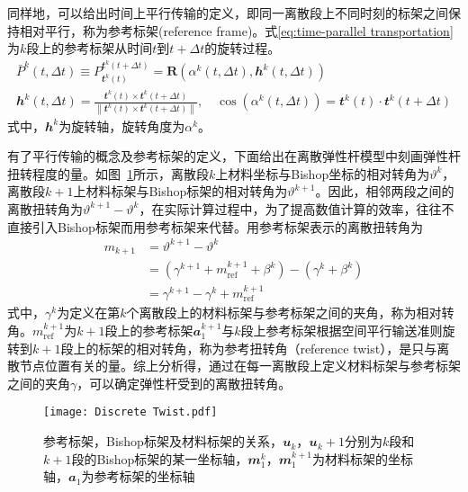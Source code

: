 同样地，可以给出时间上平行传输的定义，即同一离散段上不同时刻的标架之间保持相对平行，称为参考标架(reference frame)。式\eqref{eq:time-parallel transportation}为$k$段上的参考标架从时间$t$到$t+\Delta t$的旋转过程。
\begin{equation}
	\begin{gathered}
		\bar{P}^{k}(t, \Delta t) \equiv P_{\mathbfit{t}^{k}(t)}^{\mathbfit{t}^{k}(t+\Delta t)}=\mathbf{R}\left(\alpha^{k}(t, \Delta t), \mathbfit{h}^{k}(t, \Delta t)\right) \\
		\mathbfit{h}^{k}(t, \Delta t)=\frac{\mathbfit{t}^{k}(t) \times \mathbfit{t}^{k}(t+\Delta t)}{\left\|\mathbfit{t}^{k}(t) \times \mathbfit{t}^{k}(t+\Delta t)\right\|}, \quad \cos \left(\alpha^{k}(t, \Delta t)\right)=\mathbfit{t}^{k}(t) \cdot \mathbfit{t}^{k}(t+\Delta t)
\end{gathered}
\label{eq:time-parallel transportation}
\end{equation}
式中，$\mathbfit{h}^k$为旋转轴，旋转角度为$\alpha^k$。

有了平行传输的概念及参考标架的定义，下面给出在离散弹性杆模型中刻画弹性杆扭转程度的量。如图~\ref{fig:Discrete Twist}所示，离散段$k$上材料坐标与Bishop坐标的相对转角为$\vartheta^k$，离散段$k+1$上材料标架与Bishop标架的相对转角为$\vartheta^{k+1}$。因此，相邻两段之间的离散扭转角为$\vartheta^{k+1}-\vartheta^k$，在实际计算过程中，为了提高数值计算的效率，往往不直接引入Bishop标架而用参考标架来代替\cite{bergou2010discrete}。用参考标架表示的离散扭转角为
\begin{equation}
	\begin{aligned}m_{k+1} & =\vartheta^{k+1}-\vartheta^{k} \\& =\left(\gamma^{k+1}+m_{\mathrm{ref}}^{k+1}+\beta^{k}\right)-\left(\gamma^{k}+\beta^{k}\right) \\& =\gamma^{k+1}-\gamma^{k}+m_{\mathrm{ref}}^{k+1}\end{aligned}
\end{equation}
式中，$\gamma^k$为定义在第$k$个离散段上的材料标架与参考标架之间的夹角，称为相对转角。$m_{\mathrm{ref}}^{k+1}$为$k+1$段上的参考标架$\mathbfit{a}_1^{k+1}$与$k$段上参考标架根据空间平行输送准则旋转到$k+1$段上的标架的相对转角，称为参考扭转角（reference twist），是只与离散节点位置有关的量。综上分析得，通过在每一离散段上定义材料标架与参考标架之间的夹角$\gamma$，可以确定弹性杆受到的离散扭转角。
\begin{figure}
	\centering
	\texttt{[image: Discrete Twist.pdf]}
	\caption{参考标架，Bishop标架及材料标架的关系\cite{jawed2018primer}，$\mathbfit{u}_k$，$\mathbfit{u}_k+1$分别为$k$段和$k+1$段的Bishop标架的某一坐标轴，$\mathbfit{m}^{k}_1$，$\mathbfit{m}^{k+1}_1$为材料标架的坐标轴，$\mathbfit{a_1}$为参考标架的坐标轴}
	\label{fig:Discrete Twist}
\end{figure}

